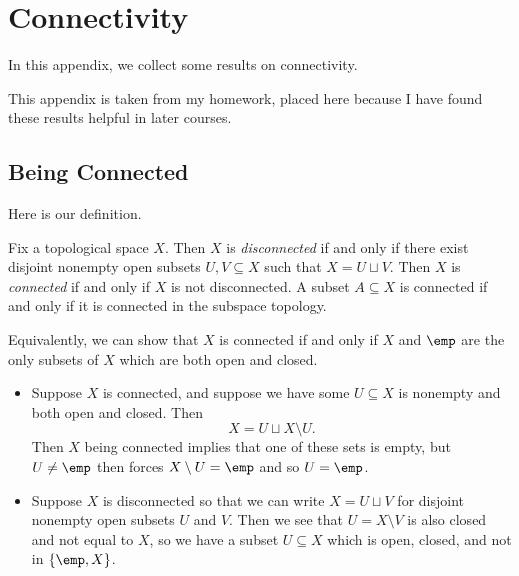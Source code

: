 \documentclass[../notes.tex]{subfiles}
\begin{document}
\section{Connectivity}

In this appendix, we collect some results on connectivity.
\begin{warn}
	This appendix is taken from my homework, placed here because I have found these results helpful in later courses.
\end{warn}

\subsection{Being Connected}
Here is our definition.
\begin{definition}[connected]
	Fix a topological space $X$. Then $X$ is \textit{disconnected} if and only if there exist disjoint nonempty open subsets $U,V\subseteq X$ such that $X=U\sqcup V$. Then $X$ is \textit{connected} if and only if $X$ is not disconnected. A subset $A\subseteq X$ is connected if and only if it is connected in the subspace topology.
\end{definition}
\begin{remark} \label{rem:conn-by-clopen}
	Equivalently, we can show that $X$ is connected if and only if $X$ and $\emp$ are the only subsets of $X$ which are both open and closed.
	\begin{itemize}
		\item Suppose $X$ is connected, and suppose we have some $U\subseteq X$ is nonempty and both open and closed. Then
		\[X=U\sqcup X\setminus U.\]
		Then $X$ being connected implies that one of these sets is empty, but $U\ne\emp$ then forces $X\setminus U=\emp$ and so $U=\emp$.
		\item Suppose $X$ is disconnected so that we can write $X=U\sqcup V$ for disjoint nonempty open subsets $U$ and $V$. Then we see that $U=X\setminus V$ is also closed and not equal to $X$, so we have a subset $U\subseteq X$ which is open, closed, and not in $\{\emp,X\}$.
	\end{itemize}
\end{remark}
\end{document}
